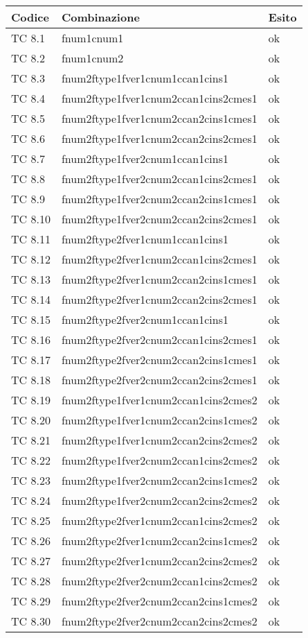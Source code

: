 \vspace{1cm}

\begin{tabular}{|p{3cm}|p{7cm}|p{3cm}|}
	\hline
	\rowcolor{Gray}
	\textbf{Codice} & \textbf{Combinazione} & \textbf{Esito}\tabularnewline
	\hline
	TC 8.1			& fnum1cnum1					& ok \tabularnewline
	\hline
	TC 8.2			& fnum1cnum2					& ok \tabularnewline
	\hline
	TC 8.3			& fnum2ftype1fver1cnum1ccan1cins1		& ok \tabularnewline
	\hline
	TC 8.4			& fnum2ftype1fver1cnum2ccan1cins2cmes1		& ok \tabularnewline
	\hline
	TC 8.5			& fnum2ftype1fver1cnum2ccan2cins1cmes1		& ok \tabularnewline
	\hline
	TC 8.6			& fnum2ftype1fver1cnum2ccan2cins2cmes1		& ok \tabularnewline
	\hline
	TC 8.7			& fnum2ftype1fver2cnum1ccan1cins1		& ok \tabularnewline
	\hline
	TC 8.8			& fnum2ftype1fver2cnum2ccan1cins2cmes1		& ok \tabularnewline
	\hline
	TC 8.9			& fnum2ftype1fver2cnum2ccan2cins1cmes1		& ok \tabularnewline
	\hline
	TC 8.10			& fnum2ftype1fver2cnum2ccan2cins2cmes1		& ok \tabularnewline
	\hline
	TC 8.11			& fnum2ftype2fver1cnum1ccan1cins1		& ok \tabularnewline
	\hline
	TC 8.12			& fnum2ftype2fver1cnum2ccan1cins2cmes1		& ok \tabularnewline
	\hline
	TC 8.13			& fnum2ftype2fver1cnum2ccan2cins1cmes1		& ok \tabularnewline
	\hline
	TC 8.14			& fnum2ftype2fver1cnum2ccan2cins2cmes1		& ok \tabularnewline
	\hline
	TC 8.15			& fnum2ftype2fver2cnum1ccan1cins1		& ok \tabularnewline
	\hline
	TC 8.16			& fnum2ftype2fver2cnum2ccan1cins2cmes1		& ok \tabularnewline
	\hline
	TC 8.17			& fnum2ftype2fver2cnum2ccan2cins1cmes1		& ok \tabularnewline
	\hline
	TC 8.18			& fnum2ftype2fver2cnum2ccan2cins2cmes1		& ok \tabularnewline
	\hline
	TC 8.19			& fnum2ftype1fver1cnum2ccan1cins2cmes2		& ok \tabularnewline
	\hline
	TC 8.20			& fnum2ftype1fver1cnum2ccan2cins1cmes2		& ok \tabularnewline
	\hline
	TC 8.21			& fnum2ftype1fver1cnum2ccan2cins2cmes2		& ok \tabularnewline
	\hline
	TC 8.22			& fnum2ftype1fver2cnum2ccan1cins2cmes2		& ok \tabularnewline
	\hline
	TC 8.23			& fnum2ftype1fver2cnum2ccan2cins1cmes2		& ok \tabularnewline
	\hline
	TC 8.24			& fnum2ftype1fver2cnum2ccan2cins2cmes2		& ok \tabularnewline
	\hline
	TC 8.25			& fnum2ftype2fver1cnum2ccan1cins2cmes2		& ok \tabularnewline
	\hline
	TC 8.26			& fnum2ftype2fver1cnum2ccan2cins1cmes2		& ok \tabularnewline
	\hline
	TC 8.27			& fnum2ftype2fver1cnum2ccan2cins2cmes2		& ok \tabularnewline
	\hline
	TC 8.28			& fnum2ftype2fver2cnum2ccan1cins2cmes2		& ok \tabularnewline
	\hline
	TC 8.29			& fnum2ftype2fver2cnum2ccan2cins1cmes2		& ok \tabularnewline
	\hline
	TC 8.30			& fnum2ftype2fver2cnum2ccan2cins2cmes2		& ok \tabularnewline
	\hline
\end{tabular}
\clearpage




